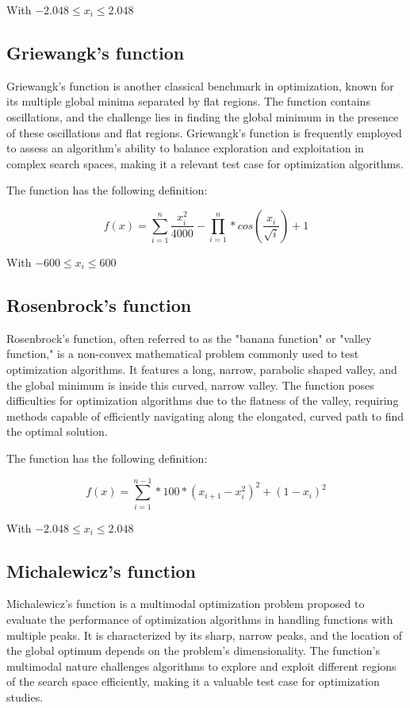 \documentclass[conference]{IEEEtran}
\begin{document}
With $-2.048 \leq x_i \leq 2.048$

\subsection{Griewangk's function}
Griewangk's function is another classical benchmark in optimization, known for its multiple global minima separated by flat regions.
The function contains oscillations, and the challenge lies in finding the global minimum in the presence of these oscillations
and flat regions. Griewangk's function is frequently employed to assess an algorithm's ability to balance exploration
and exploitation in complex search spaces, making it a relevant test case for optimization algorithms.

The function has the following definition:

\begin{equation}
    f(x) = \sum_{i=1}^{n} \frac{x_i^2}{4000} - \prod_{i=1}^{n} * cos(\frac{x_i}{\sqrt{i}}) + 1
\end{equation}

With $-600 \leq x_i \leq 600$

\subsection{Rosenbrock's function}
Rosenbrock's function, often referred to as the "banana function" or "valley function," is a non-convex mathematical problem
commonly used to test optimization algorithms. It features a long, narrow, parabolic shaped valley, and the global minimum
is inside this curved, narrow valley. The function poses difficulties for optimization algorithms due to the flatness of the valley,
requiring methods capable of efficiently navigating along the elongated, curved path to find the optimal solution.

The function has the following definition:

\begin{equation}
    f(x) = \sum_{i=1}^{n-1} * 100 * (x_{i+1} - x_i^2)^2 + (1 - x_i)^2
\end{equation}

With $-2.048 \leq x_i \leq 2.048$

\subsection{Michalewicz's function}
Michalewicz's function is a multimodal optimization problem proposed to evaluate the performance of optimization algorithms
in handling functions with multiple peaks. It is characterized by its sharp, narrow peaks, and the location of the global optimum
depends on the problem's dimensionality. The function's multimodal nature challenges algorithms to explore and exploit different regions
of the search space efficiently, making it a valuable test case for optimization studies.
\end{document}
